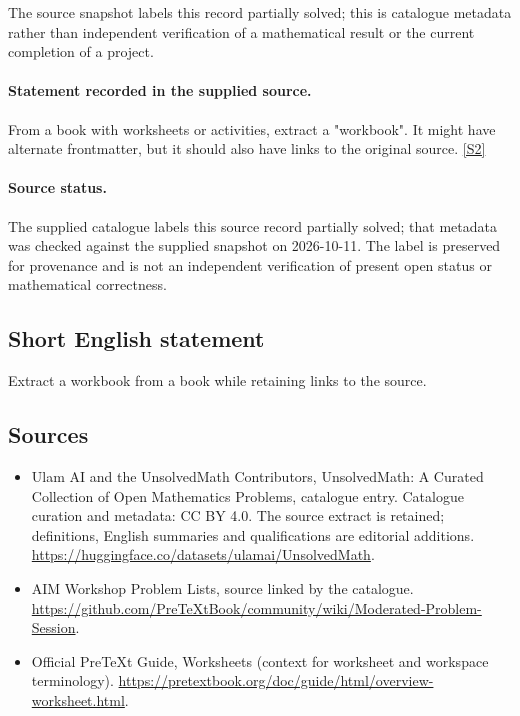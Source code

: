 \documentclass[11pt]{article}
\begin{document}
The source snapshot labels this record partially solved; this is catalogue metadata rather than independent verification of a mathematical result or the current completion of a project.
\paragraph{Statement recorded in the supplied source.}
From a book with worksheets or activities, extract a "workbook". It might have alternate frontmatter, but it should also have links to the original source. \href{https://github.com/PreTeXtBook/community/wiki/Moderated-Problem-Session}{[S2]}
\paragraph{Source status.}
The supplied catalogue labels this source record partially solved; that metadata was checked against the supplied snapshot on 2026-10-11. The label is preserved for provenance and is not an independent verification of present open status or mathematical correctness.
\subsection{Short English statement}
Extract a workbook from a book while retaining links to the source.
\subsection{Sources}
\begin{itemize}
\item[S1] Ulam AI and the UnsolvedMath Contributors, UnsolvedMath: A Curated Collection of Open Mathematics Problems, catalogue entry. Catalogue curation and metadata: CC BY 4.0. The source extract is retained; definitions, English summaries and qualifications are editorial additions.
\url{https://huggingface.co/datasets/ulamai/UnsolvedMath}.
\item[S2] AIM Workshop Problem Lists, source linked by the catalogue.
\url{https://github.com/PreTeXtBook/community/wiki/Moderated-Problem-Session}.
\item[S3] Official PreTeXt Guide, Worksheets (context for worksheet and workspace terminology).
\url{https://pretextbook.org/doc/guide/html/overview-worksheet.html}.
\end{itemize}
\end{document}
